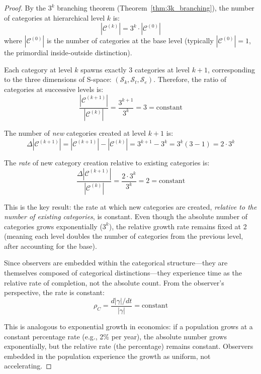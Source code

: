 \documentclass[12pt,a4paper]{article}
\theoremstyle{definition}
\theoremstyle{remark}
\newcommand{\Sentropy}{\mathcal{S}}
\begin{document}
\begin{proof}
By the $3^k$ branching theorem (Theorem~\ref{thm:3k_branching}), the number of categories at hierarchical level $k$ is:
\begin{equation}
|\mathcal{C}^{(k)}| = 3^k \cdot |\mathcal{C}^{(0)}|
\end{equation}
where $|\mathcal{C}^{(0)}|$ is the number of categories at the base level (typically $|\mathcal{C}^{(0)}| = 1$, the primordial inside-outside distinction).

Each category at level $k$ spawns exactly 3 categories at level $k+1$, corresponding to the three dimensions of S-space: $(\Sentropy_k, \Sentropy_t, \Sentropy_e)$. Therefore, the ratio of categories at successive levels is:
\begin{equation}
\frac{|\mathcal{C}^{(k+1)}|}{|\mathcal{C}^{(k)}|} = \frac{3^{k+1}}{3^k} = 3 = \text{constant}
\end{equation}

The number of \emph{new} categories created at level $k+1$ is:
\begin{equation}
\Delta |\mathcal{C}^{(k+1)}| = |\mathcal{C}^{(k+1)}| - |\mathcal{C}^{(k)}| = 3^{k+1} - 3^k = 3^k(3 - 1) = 2 \cdot 3^k
\end{equation}

The \emph{rate} of new category creation relative to existing categories is:
\begin{equation}
\frac{\Delta |\mathcal{C}^{(k+1)}|}{|\mathcal{C}^{(k)}|} = \frac{2 \cdot 3^k}{3^k} = 2 = \text{constant}
\end{equation}

This is the key result: the rate at which new categories are created, \emph{relative to the number of existing categories}, is constant. Even though the absolute number of categories grows exponentially ($3^k$), the relative growth rate remains fixed at 2 (meaning each level doubles the number of categories from the previous level, after accounting for the base).

Since observers are embedded within the categorical structure—they are themselves composed of categorical distinctions—they experience time as the relative rate of completion, not the absolute count. From the observer's perspective, the rate is constant:
\begin{equation}
\rho_C = \frac{d|\gamma|/dt}{|\gamma|} = \text{constant}
\end{equation}

This is analogous to exponential growth in economics: if a population grows at a constant percentage rate (e.g., 2\% per year), the absolute number grows exponentially, but the relative rate (the percentage) remains constant. Observers embedded in the population experience the growth as uniform, not accelerating.
\end{proof}
\end{document}
